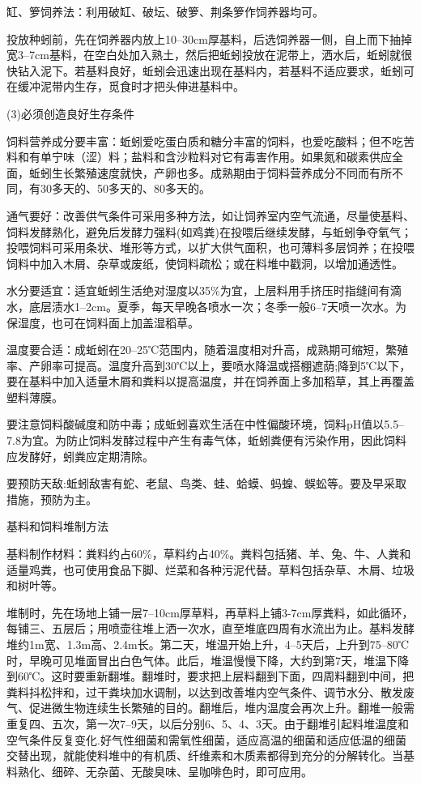 \documentclass{ctexbook}
\begin{document}
缸、箩饲养法：利用破缸、破坛、破箩、荆条箩作饲养器均可。

投放种蚓前，先在饲养器内放上10--30cm厚基料，后选饲养器一侧，自上而下抽掉宽3--7cm基料，在空白处加入熟土，然后把蚯蚓投放在泥带上，洒水后，蚯蚓就很快钻入泥下。若基料良好，蚯蚓会迅速出现在基料内，若基料不适应要求，蚯蚓可在缓冲泥带内生存，觅食时才把头伸进基料中。

(3)必须创造良好生存条件

饲料营养成分要丰富：蚯蚓爱吃蛋白质和糖分丰富的饲料，也爱吃酸料；但不吃苦料和有单宁味（涩）料；盐料和含沙粒料对它有毒害作用。如果氮和碳素供应全面，蚯蚓生长繁殖速度就快，产卵也多。成熟期由于饲料营养成分不同而有所不同，有30多天的、50多天的、80多天的。

通气要好：改善供气条件可采用多种方法，如让饲养室内空气流通，尽量使基料、饲料发酵熟化，避免后发酵力强料(如鸡粪)在投喂后继续发酵，与蚯蚓争夺氧气；投喂饲料可采用条状、堆形等方式，以扩大供气面积，也可薄料多层饲养；在投喂饲料中加入木屑、杂草或废纸，使饲料疏松；或在料堆中戳洞，以增加通透性。

水分要适宜：适宜蚯蚓生活绝对湿度以35\%为宜，上层料用手挤压时指缝间有滴水，底层渍水1--2cm。夏季，每天早晚各喷水一次；冬季一般6--7天喷一次水。为保湿度，也可在饲料面上加盖湿稻草。

温度要合适：成蚯蚓在20--25℃范围内，随着温度相对升高，成熟期可缩短，繁殖率、产卵率可提高。温度升高到30℃以上，要喷水降温或搭棚遮荫;降到5℃以下，要在基料中加入适量木屑和粪料以提高温度，并在饲养面上多加稻草，其上再覆盖塑料薄膜。

要注意饲料酸碱度和防中毒；成蚯蚓喜欢生活在中性偏酸环境，饲料pH值以5.5--7.8为宜。为防止饲料发酵过程中产生有毒气体，蚯蚓粪便有污染作用，因此饲料应发酵好，蚓粪应定期清除。

要预防天敌:蚯蚓敌害有蛇、老鼠、鸟类、蛙、蛤蟆、蚂蝗、蜈蚣等。要及早采取措施，预防为主。

基料和饲料堆制方法

基料制作材料：粪料约占60\%，草料约占40\%。粪料包括猪、羊、兔、牛、人粪和适量鸡粪，也可使用食品下脚、烂菜和各种污泥代替。草料包括杂草、木屑、垃圾和树叶等。

堆制时，先在场地上铺一层7--10cm厚草料，再草料上铺3-7cm厚粪料，如此循环，每铺三、五层后；用喷壶往堆上洒一次水，直至堆底四周有水流出为止。基料发酵堆约1m宽、1.3m高、2.4m长。第二天，堆温开始上升，4--5天后，上升到75--80℃时，早晚可见堆面冒出白色气体。此后，堆温慢慢下降，大约到第7天，堆温下降到60℃。这时要重新翻堆。翻堆时，要求把上层料翻到下面，四周料翻到中间，把粪料抖松拌和，过干粪块加水调制，以达到改善堆内空气条件、调节水分、散发废气、促进微生物连续生长繁殖的目的。翻堆后，堆内温度会再次上升。翻堆一般需重复四、五次，第一次7--9天，以后分别6、5、4、3天。由于翻堆引起料堆温度和空气条件反复变化.好气性细菌和需氧性细菌，适应高温的细菌和适应低温的细菌交替出现，就能使料堆中的有机质、纤维素和木质素都得到充分的分解转化。当基料熟化、细碎、无杂菌、无酸臭味、呈咖啡色时，即可应用。
\end{document}
